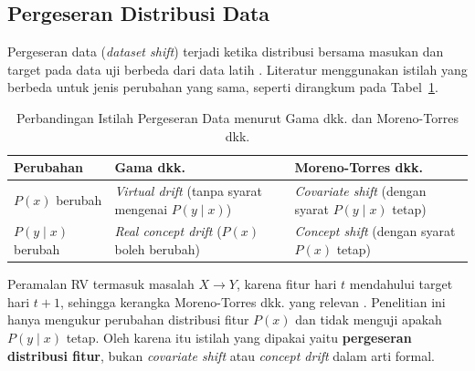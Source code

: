 \subsection{Pergeseran Distribusi Data}
Pergeseran data (\textit{dataset shift}) terjadi ketika distribusi bersama
masukan dan target pada data uji berbeda dari data latih
\cite{morenotorres2012}. Literatur menggunakan istilah yang berbeda untuk jenis
perubahan yang sama, seperti dirangkum pada Tabel~\ref{tab:istilah}.

\begin{table}[htbp]
  \caption{Perbandingan Istilah Pergeseran Data menurut Gama dkk. dan
    Moreno-Torres dkk.}
  \label{tab:istilah}
  \centering
  \begingroup
  \small
  \begin{tabular}{|l|p{}|p{}|}
    \hline
    \textbf{Perubahan} & \textbf{Gama dkk. \cite{gama2014}} &
    \textbf{Moreno-Torres dkk. \cite{morenotorres2012}} \\
    \hline
    $P(x)$ berubah & \textit{Virtual drift} (tanpa syarat mengenai
    $P(y \mid x)$) & \textit{Covariate shift} (dengan syarat $P(y \mid x)$
    tetap) \\
    \hline
    $P(y \mid x)$ berubah & \textit{Real concept drift} ($P(x)$ boleh berubah) &
    \textit{Concept shift} (dengan syarat $P(x)$ tetap) \\
    \hline
  \end{tabular}
  \endgroup
\end{table}

Peramalan RV termasuk masalah $X \rightarrow Y$, karena fitur hari $t$
mendahului target hari $t+1$, sehingga kerangka Moreno-Torres dkk. yang relevan
\cite{morenotorres2012}. Penelitian ini hanya mengukur perubahan distribusi
fitur $P(x)$ dan tidak menguji apakah $P(y \mid x)$ tetap. Oleh karena itu
istilah yang dipakai yaitu \textbf{pergeseran distribusi fitur}, bukan
\textit{covariate shift} atau \textit{concept drift} dalam arti formal.

